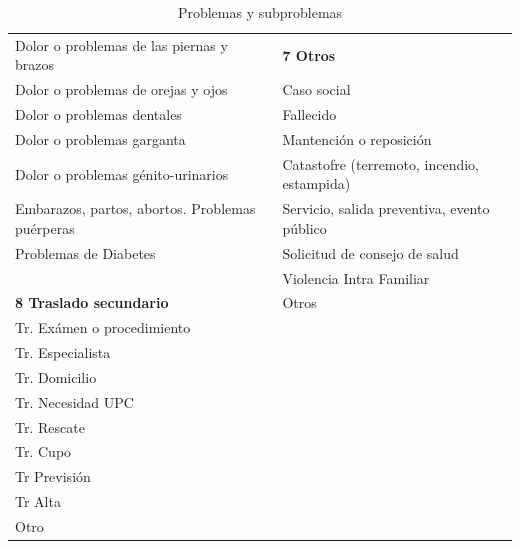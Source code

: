 \documentclass{article}
\begin{document}
\begin{minipage}{\linewidth}
\begin{table}[H]
\begin{tabular}{ll}
Dolor o problemas de las piernas y brazos                  & \textbf{7 Otros}                                  \\
Dolor o problemas de orejas y ojos                         & Caso social                                       \\
Dolor o problemas dentales                                 & Fallecido                                         \\
Dolor o problemas garganta                                 & Mantención o reposición                           \\
Dolor o problemas génito-urinarios                         & Catastofre (terremoto, incendio, estampida)       \\
Embarazos, partos, abortos. Problemas puérperas            & Servicio, salida preventiva, evento público       \\
Problemas de Diabetes                                      & Solicitud de consejo de salud                     \\
                                                           & Violencia Intra Familiar                          \\
\textbf{8 Traslado secundario}                             & Otros                                             \\
Tr. Exámen o procedimiento                                 &                                                   \\
Tr. Especialista                                           &                                                   \\
Tr. Domicilio                                              &                                                   \\
Tr. Necesidad UPC                                          &                                                   \\
Tr. Rescate                                                &                                                   \\
Tr. Cupo                                                   &                                                   \\
Tr Previsión                                               &                                                   \\
Tr Alta                                                    &                                                   \\
Otro                                                       &                                                  
\end{tabular}
\caption{Problemas y subproblemas}
\label{problemas y subproblemas}
\end{table}


\label{Anexo1}
\end{minipage} 
\clearpage
\end{document}
